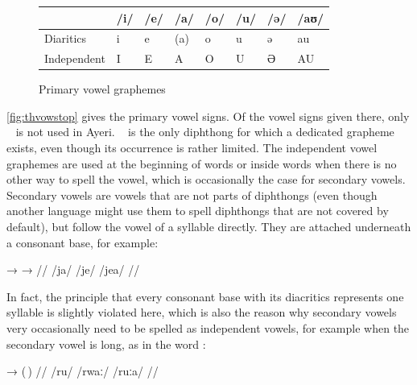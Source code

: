 \begin{figure}[t]
\caption{Primary vowel graphemes}

\begin{tabu} to \linewidth{H[c] X[c] X[c] X[c] X[c] X[c] X[c] X[c]}
\toprule
\tableheaderfont

	& /i/
	& /e/
	& /a/
	& /o/
	& /u/
	& /ə/
	& /aʊ/
	\\
	
\toprule
	
Diaritics
	& \Tagati\huge *i
	& \Tagati\huge *e
	& \huge ({\Tagati *a})
	& \Tagati\huge *o
	& \Tagati\huge *u
	& \Tagati\huge *ə
	& \Tagati\huge *au
	\\

\midrule

Independent
	& \Tagati\huge I
	& \Tagati\huge E
	& \Tagati\huge A
	& \Tagati\huge O
	& \Tagati\huge U
	& \Tagati\huge Ə
	& \Tagati\huge AU
	\\

\bottomrule
\end{tabu}
\label{fig:thvowstop}
\end{figure}

\autoref{fig:thvowstop} gives the primary vowel signs. Of the vowel signs given
there, only ~ is not used in Ayeri. ~ is the
only diphthong for which a dedicated grapheme exists, even though its
occurrence is rather limited. The independent vowel graphemes are used at the
beginning of words or inside words when there is no other way to spell the
vowel, which is occasionally the case for secondary vowels. Secondary vowels
are vowels that are not parts of diphthongs (even though another language might
use them to spell diphthongs that are not covered by default), but follow the
vowel of a syllable directly. They are attached underneath a consonant base,
for example:

\ex[lingstyle=thex]\begingl
	\gla {}	→		→	 //
	\glb /ja/	{}	/je/		{}	/jea/ //
\endgl\xe

In fact, the principle that every consonant base with its diacritics represents
one syllable is slightly violated here, which is also the reason why secondary 
vowels very occasionally need to be spelled as independent vowels, for example 
when the secondary vowel is long, as in the word :

\ex[lingstyle=thex]\label{ex:rwaa}\begingl
	\gla {}	→		\quad	(\,) //
	\glb /ru/	{}	/rwaː/ 		\quad	/ruːa/ //
\endgl\xe


